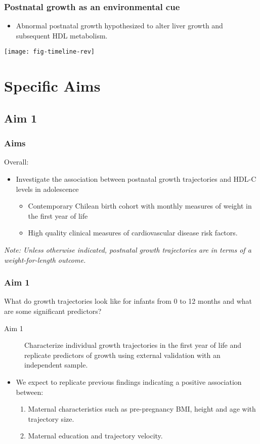 \documentclass[10pt]{beamer}\usepackage[]{graphicx}\usepackage[]{color}
\begin{document}
\begin{frame}
\frametitle{Postnatal growth as an environmental cue}
\begin{itemize}
	\item Abnormal postnatal growth hypothesized to alter liver growth and subsequent HDL metabolism.
\end{itemize}
\centering
\texttt{[image: fig-timeline-rev]}
\end{frame}

\section{Specific Aims}

\subsection{Aim 1}
\begin{frame}
\frametitle{Aims}
Overall: 
\begin{itemize}
	\item Investigate the association between postnatal growth trajectories and HDL-C levels in adolescence
		\begin{itemize}
			\item Contemporary Chilean birth cohort with monthly measures of weight in the first year of life 
			\item High quality clinical measures of cardiovascular disease risk factors.
			\end{itemize}
		\end{itemize}
\smallskip

\textit{Note: Unless otherwise indicated, postnatal growth trajectories are in terms of a weight-for-length outcome.}

\end{frame}

\begin{frame}
\frametitle{Aim 1}
What do growth trajectories look like for infants from 0 to 12 months and what are some significant predictors?
\smallskip
\begin{description}
	\item [Aim 1]  Characterize individual growth trajectories in the first year of life and replicate predictors of growth using external validation with an independent sample. 
\end{description}	

\begin{itemize} 
\item We expect to replicate previous findings indicating a positive association between:
	\begin{enumerate} 
		\item Maternal characteristics such as pre-pregnancy BMI, height and age with trajectory size.
		\item Maternal education and trajectory velocity.
		\end{enumerate}
\end{itemize}
\end{frame}
\end{document}
